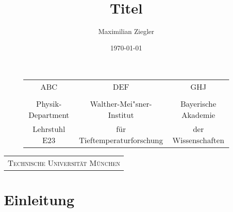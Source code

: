 \documentclass[a4paper, 10pt]{scrreprt}
\author{Maximilian Ziegler}
\title{Titel}
\date{\today}
\begin{document}
\begin{titlepage}
\clearpage \thispagestyle{empty} \setcounter{page}{0}

\begin{center}
\begin{figure}[h]
\centering
\begin{tabular}{ccc}
        ABC	&	DEF	&	GHJ \\
        &&\\
    \large{Physik-Department}&
    \large{Walther-Mei"sner-Institut}&
    \large{Bayerische Akademie}\\
    \large{Lehrstuhl E23}&
    \large{für Tieftemperaturforschung}&
    \large{der Wissenschaften}
\end{tabular}
\end{figure}
\vspace{1.5cm}

%



%
\begin{tabular}{c}

    \textsc{\Large{Technische Universität München}}%
\end{tabular}
\end{center}
\end{titlepage}
%
\clearpage \thispagestyle{empty} \setcounter{page}{0}
\newpage \thispagestyle{empty}
\tableofcontents
\newpage

\chapter{Einleitung}
\label{cha:Einleitung}
\end{document}
